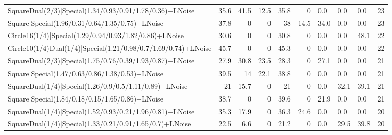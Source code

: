 \begin{tabular}{lrrrrrlllr}
 SquareDual(2/3)|Special(1.34/0.93/0.91/1.78/0.36)+LNoise        &            35.6 &            41.5 &            12.5 &            35.8 &            0   & 0.0             & 0.0            & 0.0            &           23 \\
 Square|Special(1.96/0.31/0.64/1.35/0.75)+LNoise                 &            37.8 &             0   &             0   &            38   &           14.5 & 34.0            & 0.0            & 0.0            &           23 \\
 Circle16(1/4)|Special(1.29/0.94/0.93/1.82/0.86)+LNoise          &            30.6 &             0   &             0   &            30.8 &            0   & 0.0             & 0.0            & 48.1           &           22 \\
 Circle10(1/4)Dual(1/4)|Special(1.21/0.98/0.7/1.69/0.74)+LNoise  &            45.7 &             0   &             0   &            45.3 &            0   & 0.0             & 0.0            & 0.0            &           22 \\
 SquareDual(2/3)|Special(1.75/0.76/0.39/1.93/0.87)+LNoise        &            27.9 &            30.8 &            23.5 &            28.3 &            0   & 27.1            & 0.0            & 0.0            &           21 \\
 Square|Special(1.47/0.63/0.86/1.38/0.53)+LNoise                 &            39.5 &            14   &            22.1 &            38.8 &            0   & 0.0             & 0.0            & 0.0            &           21 \\
 SquareDual(1/4)|Special(1.26/0.9/0.5/1.11/0.89)+LNoise          &            21   &            15.7 &             0   &            21   &            0   & 0.0             & 32.1           & 39.1           &           21 \\
 Square|Special(1.84/0.18/0.15/1.65/0.86)+LNoise                 &            38.7 &             0   &             0   &            39.6 &            0   & 21.9            & 0.0            & 0.0            &           21 \\
 SquareDual(1/4)|Special(1.52/0.93/0.21/1.96/0.81)+LNoise        &            35.3 &            17.9 &             0   &            36.3 &           24.6 & 0.0             & 0.0            & 0.0            &           20 \\
 SquareDual(1/4)|Special(1.33/0.21/0.91/1.65/0.7)+LNoise         &            22.5 &             6.6 &             0   &            21.2 &            0   & 0.0             & 29.5           & 39.8           &           20 \\

\end{tabular}
